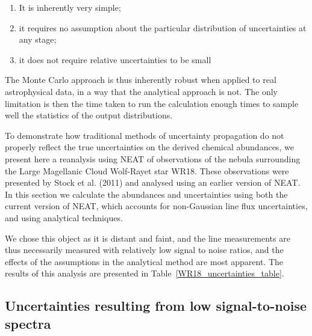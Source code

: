\documentclass[useAMS,usenatbib]{mn2e}
\begin{document}
\begin{enumerate}
  \item It is inherently very simple;
  \item it requires no assumption about the particular distribution of uncertainties at any stage;
  \item it does not require relative uncertainties to be small
\end{enumerate}

The Monte Carlo approach is thus inherently robust when applied to real astrophysical data, in a way that the analytical approach is not.  The only limitation is then the time taken to run the calculation enough times to sample well the statistics of the output distributions.

To demonstrate how traditional methods of uncertainty propagation do not properly reflect the true uncertainties on the derived chemical abundances, we present here a reanalysis using NEAT of observations of the nebula surrounding the Large Magellanic Cloud Wolf-Rayet star WR18.  These observations were presented by Stock et al. (2011) and analysed using an earlier version of NEAT.  In this section we calculate the abundances and uncertainties using both the current version of NEAT, which accounts for non-Gaussian line flux uncertainties, and using analytical techniques.

We chose this object as it is distant and faint, and the line measurements are thus necessarily measured with relatively low signal to noise ratios, and the effects of the assumptions in the analytical method are most apparent.  The results of this analysis are presented in Table~\ref{WR18_uncertainties_table}.



\subsection{Uncertainties resulting from low signal-to-noise spectra}
\end{document}
